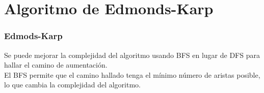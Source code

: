 \documentclass{beamer}
\begin{document}
\begin{frame}
\begin{columns}
\begin{figure}
				\end{figure}
		\end{columns}
	\end{frame}


\section[Edmonds-Karp]{Algoritmo de Edmonds-Karp}

	\begin{frame}
		\frametitle{Edmods-Karp}
		Se puede mejorar la complejidad del algoritmo usando BFS en lugar de DFS para hallar el camino de aumentación.\\
		El BFS permite que el camino hallado tenga el mínimo número de aristas posible, lo que cambia la complejidad del algoritmo.
	\end{frame}
	
\end{document}

